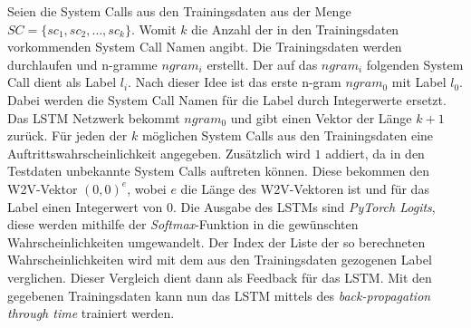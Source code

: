             Seien die System Calls aus den Trainingsdaten aus der Menge $SC = \{sc_1,sc_2,\dots,sc_k\}$.
            Womit $k$ die Anzahl der in den Trainingsdaten vorkommenden System Call Namen angibt.
            Die Trainingsdaten werden durchlaufen und n-gramme $ngram_i$ erstellt.
            Der auf das $ngram_i$ folgenden System Call dient als Label $l_i$.
            Nach dieser Idee ist das erste n-gram $ngram_0$ mit Label $l_0$.
            Dabei werden die System Call Namen für die Label durch Integerwerte ersetzt. 
            Das \ac{LSTM} Netzwerk bekommt $ngram_0$ und gibt einen Vektor der Länge $k+1$ zurück.
            Für jeden der $k$ möglichen System Calls aus den Trainingsdaten eine Auftrittswahrscheinlichkeit angegeben.
            Zusätzlich wird $1$ addiert, da in den Testdaten unbekannte System Calls auftreten können.
            Diese bekommen den \ac{W2V}-Vektor $(0,0)^e$, wobei $e$ die Länge des \ac{W2V}-Vektoren ist und für das Label einen Integerwert von $0$. 
            Die Ausgabe des \acp{LSTM} sind \textit{PyTorch Logits}, diese werden mithilfe der \textit{Softmax}-Funktion in die gewünschten Wahrscheinlichkeiten umgewandelt.
            Der Index der Liste der so berechneten Wahrscheinlichkeiten wird mit dem aus den Trainingsdaten gezogenen Label verglichen.
            Dieser Vergleich dient dann als Feedback für das \ac{LSTM}.
            Mit den gegebenen Trainingsdaten kann nun das \ac{LSTM} mittels des \textit{back-propagation through time}  trainiert werden.


